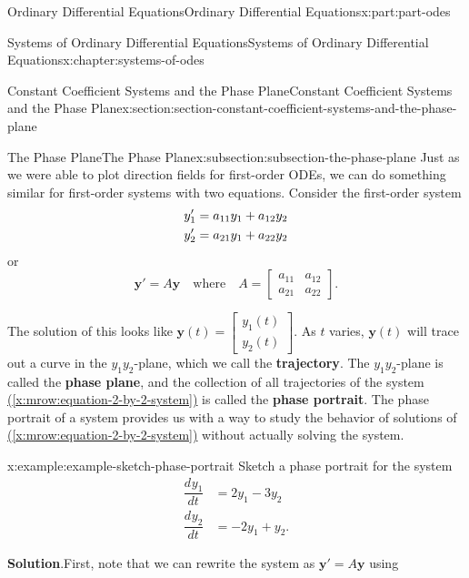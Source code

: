 \documentclass[oneside,10pt,]{book}
\newcommand{\blocktitlefont}{\relax}
\newcommand{\xreffont}{\relax}
\newcommand{\terminology}[1]{\textbf{#1}}
\numberwithin{equation}{part}
\renewcommand{\vec}[1]{\mathbf{#1}}
\newcommand{\dv}[3][]{\dfrac{d^{#1} #2}{d #3^{#1}}}
\newcommand{\amp}{&}
\begin{document}
\begin{partptx}{Ordinary Differential Equations}{}{Ordinary Differential Equations}{}{}{x:part:part-odes}
\begin{chapterptx}{Systems of Ordinary Differential Equations}{}{Systems of Ordinary Differential Equations}{}{}{x:chapter:systems-of-odes}
\begin{sectionptx}{Constant Coefficient Systems and the Phase Plane}{}{Constant Coefficient Systems and the Phase Plane}{}{}{x:section:section-constant-coefficient-systems-and-the-phase-plane}
\typeout{************************************************}
%
\begin{subsectionptx}{The Phase Plane}{}{The Phase Plane}{}{}{x:subsection:subsection-the-phase-plane}
Just as we were able to plot direction fields for first-order ODEs, we can do something similar for first-order systems with two equations. Consider the first-order system%
\begin{align}
y'_{1}  \amp =  a_{11}y_{1} + a_{12}y_{2}\label{x:mrow:equation-2-by-2-system}\\
y'_{2}  \amp =  a_{21}y_{1}+  a_{22}y_{2}\notag
\end{align}
or%
\begin{equation*}
\vec{y}' = A\vec{y}\quad\text{where}\quad A = \begin{bmatrix}a_{11}  \amp  a_{12}  \\  a_{21}  \amp  a_{22}\end{bmatrix}.
\end{equation*}
%
\par
The solution of this looks like \(\vec{y}(t) = \begin{bmatrix}y_{1}(t) \\ y_{2}(t)\end{bmatrix}\). As \(t\) varies, \(\vec{y}(t)\) will trace out a curve in the \(y_{1}y_{2}\)-plane, which we call the \terminology{trajectory}. The \(y_{1}y_{2}\)-plane is called the \terminology{phase plane}, and the collection of all trajectories of the system \hyperref[x:mrow:equation-2-by-2-system]{({\xreffont\ref{x:mrow:equation-2-by-2-system}})} is called the \terminology{phase portrait}. The phase portrait of a system provides us with a way to study the behavior of solutions of \hyperref[x:mrow:equation-2-by-2-system]{({\xreffont\ref{x:mrow:equation-2-by-2-system}})} without actually solving the system.%
\begin{example}{}{x:example:example-sketch-phase-portrait}%
Sketch a phase portrait for the system%
\begin{align*}
\dv{y_{1}}{t}  \amp =  2y_{1} - 3y_{2}\\
\dv{y_{2}}{t}  \amp =  -2y_{1} + y_{2}.
\end{align*}
%
\par\smallskip%
\noindent\textbf{\blocktitlefont Solution}.\hypertarget{g:solution:idp105548779804832}{}\quad{}First, note that we can rewrite the system as \(\vec{y}' = A\vec{y}\) using%
\begin{equation*}

\end{equation*}
\end{example}
\end{subsectionptx}
\end{sectionptx}
\end{chapterptx}
\end{partptx}
\end{document}
